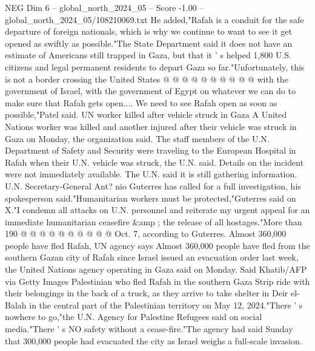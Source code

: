 \begin{textsample}{NEG Dim 6 – global\_north\_2024\_05 – Score -1.00 – global\_north\_2024\_05/108210069.txt}
He added,"Rafah is a conduit for the safe departure of foreign nationals, which is why we continue to want to see it get opened as swiftly as possible."The State Department said it does not have an estimate of Americans still trapped in Gaza, but that it ' s helped 1,800 U.S. citizens and legal permanent residents to depart Gaza so far."Unfortunately, this is not a border crossing the United States @ @ @ @ @ @ @ @ @ @ with the government of Israel, with the government of Egypt on whatever we can do to make sure that Rafah gets open....
We need to see Rafah open as soon as possible,"Patel said.
UN worker killed after vehicle struck in Gaza A United Nations worker was killed and another injured after their vehicle was struck in Gaza on Monday, the organization said.
The staff members of the U.N.
Department of Safety and Security were traveling to the European Hospital in Rafah when their U.N. vehicle was struck, the U.N. said.
Details on the incident were not immediately available.
The U.N. said it is still gathering information.
U.N.
Secretary-General Ant? nio Guterres has called for a full investigation, his spokesperson said."Humanitarian workers must be protected,"Guterres said on X."I condemn all attacks on U.N. personnel and reiterate my urgent appeal for an immediate humanitarian ceasefire \&amp ; the release of all hostages."More than 190 @ @ @ @ @ @ @ @ @ @ Oct. 7, according to Guterres.
Almost 360,000 people have fled Rafah, UN agency says Almost 360,000 people have fled from the southern Gazan city of Rafah since Israel issued an evacuation order last week, the United Nations agency operating in Gaza said on Monday.
Said Khatib/AFP via Getty Images Palestinian who fled Rafah in the southern Gaza Strip ride with their belongings in the back of a truck, as they arrive to take shelter in Deir el-Balah in the central part of the Palestinian territory on May 12, 2024."There ' s nowhere to go,"the U.N.
Agency for Palestine Refugees said on social media."There ' s NO safety without a cease-fire."The agency had said Sunday that 300,000 people had evacuated the city as Israel weighs a full-scale invasion.

\end{textsample}

